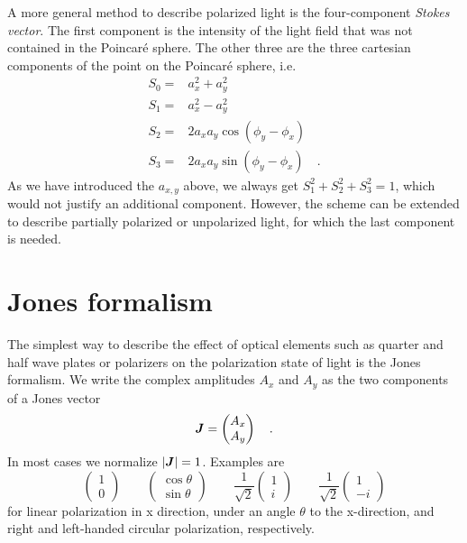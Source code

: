 A more general method to describe polarized light is the four-component \emph{Stokes vector}. The first component is the intensity of the light field that was not contained in the Poincaré sphere. The other three are the three cartesian components of the point on the Poincaré sphere, i.e.
\begin{align}
    S_0 = & a_x^2 + a_y^2 \\
    S_1 = & a_x^2 - a_y^2 \\
    S_2 = & 2 a_x  a_y \cos (\phi_y - \phi_x )\\
    S_3 = & 2 a_x  a_y \sin (\phi_y - \phi_x ) \quad .
\end{align}
As we have introduced the $a_{x,y}$ above, we always get $S_1^2 + S_2^2 + S_3^2 = 1$, which would not justify an additional component. However, the scheme can be extended to describe partially polarized or unpolarized light, for which the last component is needed.



\section{Jones formalism}

The simplest way to describe the effect of optical elements such as quarter and half wave plates or polarizers on the polarization state of light is the Jones formalism. We write the complex amplitudes $A_x$ and $A_y$ as the two components of a Jones vector
\begin{equation}
    \boldsymbol{J} = \begin{pmatrix}
        A_x \\ A_y
    \end{pmatrix} \quad .
\end{equation}
In most cases we normalize $|\boldsymbol{J}| = 1$. Examples are 
\begin{equation}
    \begin{pmatrix}
       1 \\ 0
    \end{pmatrix} 
    \qquad 
      \begin{pmatrix}
        \cos \theta \\ \sin \theta
     \end{pmatrix}
     \qquad
     \frac{1}{\sqrt{2}}
     \begin{pmatrix}
        1 \\ i
     \end{pmatrix} 
     \qquad 
     \frac{1}{\sqrt{2}}
     \begin{pmatrix}
        1 \\ -i
     \end{pmatrix} 
\end{equation}
for linear polarization in x direction, under an angle $\theta$ to the x-direction, and right and left-handed circular polarization, respectively.

